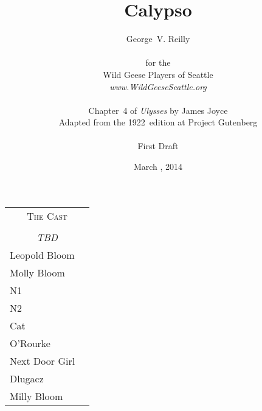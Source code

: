 


\title{\Huge Calypso}
\author{George~V. Reilly\\
\\
{\small for the}\\
Wild Geese Players of Seattle\\
{\emph{www.WildGeeseSeattle.org}}\\
\\
{\small Chapter~4 of \emph{Ulysses} by James Joyce}\\
{\small Adapted from the 1922~edition at Project Gutenberg}
\\
\\
{\small First Draft}}
\date{March , 2014}
\raggedbottom



\maketitle
\thispagestyle{empty}
\pagebreak

\begin{tabular}{lp{10cm}}
    \multicolumn{2}{c}{\Large \textsc{The Cast}} \\
\\
    \multicolumn{2}{c}{\large \textit{TBD}} \\
Leopold Bloom \\
Molly Bloom \\
N1 \\
N2 \\
Cat \\
O'Rourke \\
Next Door Girl \\
Dlugacz \\
Milly Bloom \\
\end{tabular}

\thispagestyle{empty}
\newpage


\setcounter{page}{1}








